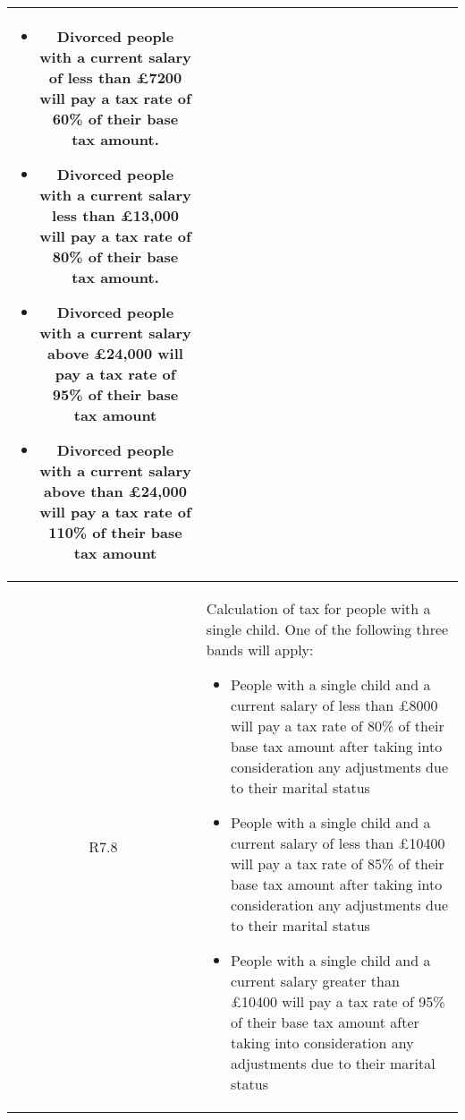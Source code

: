 \begin{table}[H]
\begin{tabularx}{\textwidth}{| c | X |}
	\begin{itemize}[itemsep=\tableitemsep, leftmargin=\tableleftsep]
		\item Divorced people with a current salary of less than £7200 will pay a tax rate
		of 60\% of their base tax amount.
		\item Divorced people with a current salary less than £13,000 will pay a tax rate of
		80\% of their base tax amount.
		\item Divorced people with a current salary above £24,000 will pay a tax rate of
		95\% of their base tax amount
		\item Divorced people with a current salary above than £24,000 will pay a tax rate
		of 110\% of their base tax amount
	\end{itemize}
	\\
	\hline %
	R7.8 & Calculation of tax for people with a single child. One of the following three bands will apply:
	\begin{itemize}[itemsep=\tableitemsep, leftmargin=\tableleftsep]
		\item People with a single child and a current salary of less than £8000 will pay a tax rate of 80\% of their base tax amount after taking into consideration any
		adjustments due to their marital status
		\item People with a single child and a current salary of less than £10400 will pay a
		tax rate of 85\% of their base tax amount after taking into consideration any
		adjustments due to their marital status
		\item People with a single child and a current salary greater than £10400 will pay a
		tax rate of 95\% of their base tax amount after taking into consideration any adjustments due to their marital status
	\end{itemize}
	\\
	\hline %
\end{tabularx}
\end{table}


